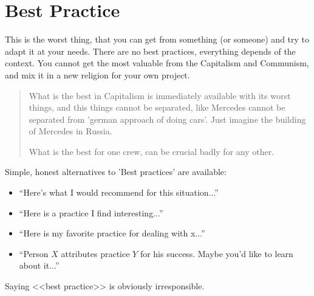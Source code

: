 \section{Best Practice}
\label{sec:Best Practice}


This is the worst thing, that you can get from something (or someone) and try to adapt it at your needs. There are no best practices, everything depends of the context. You cannot get the most valuable from the Capitalism and Communism, and mix it in a new religion for your own project.

\begin{quote}
 

What is the best in Capitalism is immediately available with its worst things, and this things cannot be separated, like Mercedes cannot be separated from 'german approach of doing cars'. Just imagine the building of Mercedes in Russia.

What is the best for one crew, can be crucial badly for any other.
\end{quote}

Simple, honest alternatives to 'Best practices' are available:

\begin{itemize}
 \item     “Here’s what I would recommend for this situation...”
 \item     “Here is a practice I find interesting...”
 \item     “Here is my favorite practice for dealing with {x}...”
 \item     “{Person $X$} attributes {practice $Y$} for his success. Maybe you’d like to learn about it...”
\end{itemize}

Saying <<best practice>> is obviously irresponsible.